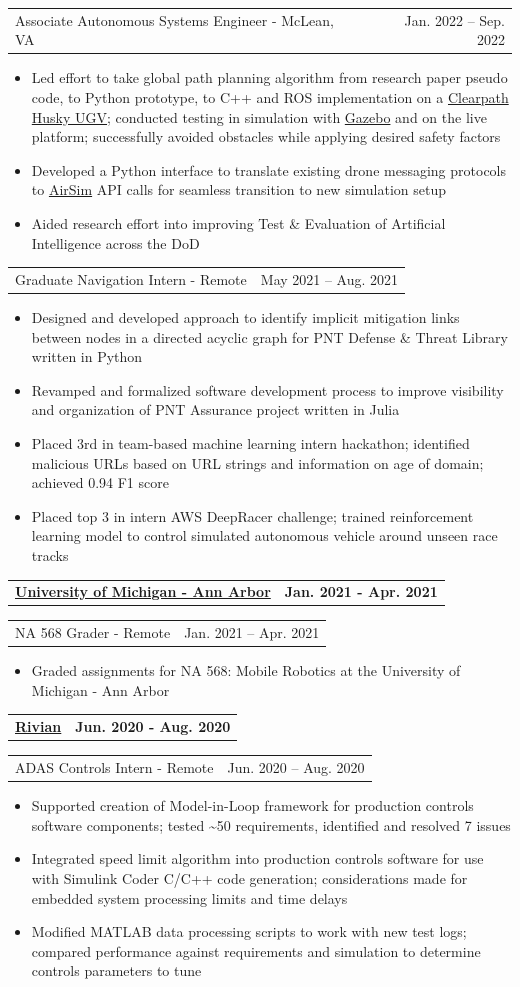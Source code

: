 \documentclass[letterpaper,11pt]{article}
\makeatletter
\newcommand{\resumeItem}[1]{
	\item\small{
		#1
	}
}
\newcommand{\resumeCompanyHeading}[2]{
  \vspace{-1pt}\item
    \begin{tabular*}{0.97\textwidth}[t]{l@{\extracolsep{\fill}}r}
      \textbf{#1} & \textbf{#2} \\
    \end{tabular*}\vspace{-0pt}
}
\newcommand{\resumeJobHeading}[3]{
	\vspace{-1pt}
	\begin{tabular*}{0.97\textwidth}[t]{l@{\extracolsep{\fill}}r}
		{\small#1} - {\small #2} & {\small #3} \\
	\end{tabular*}\vspace{-4pt}
}
\newcommand{\resumeItemListStart}{\begin{itemize}}
\newcommand{\resumeItemListEnd}{\end{itemize}\vspace{-4pt}}
\makeatother
\begin{document}
\resumeJobHeading{Associate Autonomous Systems Engineer}{McLean, VA}{Jan. 2022 -- Sep. 2022}
\resumeItemListStart
\resumeItem{Led effort to take global path planning algorithm from research paper pseudo code, to Python prototype, to C++ and ROS implementation on a \href{https://clearpathrobotics.com/husky-unmanned-ground-vehicle-robot/}{Clearpath Husky UGV}; conducted testing in simulation with \href{https://gazebosim.org/home}{Gazebo} and on the live platform; successfully avoided obstacles while applying desired safety factors}
\resumeItem{Developed a Python interface to translate existing drone messaging protocols to \href{https://microsoft.github.io/AirSim/}{AirSim} API calls for seamless transition to new simulation setup}
\resumeItem{Aided research effort into improving Test \& Evaluation of Artificial Intelligence across the DoD}
\resumeItemListEnd

\resumeJobHeading{Graduate Navigation Intern}{Remote}{May 2021 -- Aug. 2021}
\resumeItemListStart
\resumeItem{Designed and developed approach to identify implicit mitigation links between nodes in a directed acyclic graph for PNT Defense \& Threat Library written in Python}
\resumeItem{Revamped and formalized software development process to improve visibility and organization of PNT Assurance project written in Julia}
\resumeItem{Placed 3rd in team-based machine learning intern hackathon; identified malicious URLs based on URL strings and information on age of domain; achieved 0.94 F1 score}
\resumeItem{Placed top 3 in intern AWS DeepRacer challenge; trained reinforcement learning model to control simulated autonomous vehicle around unseen race tracks}
\resumeItemListEnd

\resumeCompanyHeading{\href{https://umich.edu/}{University of Michigan - Ann Arbor}}{Jan. 2021 - Apr. 2021}
\resumeJobHeading{NA 568 Grader}{Remote}{Jan. 2021 -- Apr. 2021}
\resumeItemListStart
\resumeItem{Graded assignments for NA 568: Mobile Robotics at the University of Michigan - Ann Arbor}
\resumeItemListEnd

\resumeCompanyHeading{\href{https://rivian.com/}{Rivian}}{Jun. 2020 - Aug. 2020}
\resumeJobHeading{ADAS Controls Intern}{Remote}{Jun. 2020 -- Aug. 2020}
\resumeItemListStart
\resumeItem{Supported creation of Model-in-Loop framework for production controls software components; tested \textasciitilde 50 requirements, identified and resolved 7 issues}
\resumeItem{Integrated speed limit algorithm into production controls software for use with Simulink Coder C/C++ code generation; considerations made for embedded system processing limits and time delays}
\resumeItem{Modified MATLAB data processing scripts to work with new test logs; compared performance against requirements and simulation to determine controls parameters to tune}
\resumeItemListEnd
\end{document}
